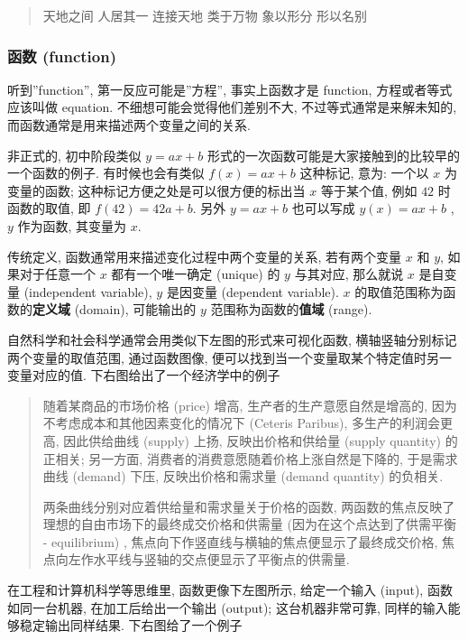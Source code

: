 \begin{quote}
天地之间 人居其一 连接天地 类于万物 象以形分 形以名别
\end{quote}

\hypertarget{ux51fdux6570-function}{%
\subsubsection{函数 (function)}\label{ux51fdux6570-function}}

听到''function'', 第一反应可能是''方程'', 事实上函数才是 function,
方程或者等式应该叫做 equation. 不细想可能会觉得他们差别不大,
不过等式通常是来解未知的, 而函数通常是用来描述两个变量之间的关系.

非正式的, 初中阶段类似 \(y=ax+b\)
形式的一次函数可能是大家接触到的比较早的一个函数的例子. 有时候也会有类似
\(f(x)=ax+b\) 这种标记, 意为: 一个以 \(x\) 为变量的函数;
这种标记方便之处是可以很方便的标出当 \(x\) 等于某个值, 例如 \(42\)
时函数的取值, 即 \(f(42)=42a+b\). 另外 \(y=ax+b\) 也可以写成
\(y(x)=ax+b\) , \(y\) 作为函数, 其变量为 \(x\).

传统定义, 函数通常用来描述变化过程中两个变量的关系, 若有两个变量 \(x\)
和 \(y\), 如果对于任意一个 \(x\) 都有一个唯一确定 (unique) 的 \(y\)
与其对应, 那么就说 \(x\) 是自变量 (independent variable), \(y\) 是因变量
(dependent variable). \(x\) 的取值范围称为函数的\textbf{定义域}
(domain), 可能输出的 \(y\) 范围称为函数的\textbf{值域} (range).

自然科学和社会科学通常会用类似下左图的形式来可视化函数,
横轴竖轴分别标记两个变量的取值范围, 通过函数图像,
便可以找到当一个变量取某个特定值时另一变量对应的值.
下右图给出了一个经济学中的例子

\begin{quote}
随着某商品的市场价格 (price) 增高, 生产者的生产意愿自然是增高的,
因为不考虑成本和其他因素变化的情况下 (Ceteris Paribus),
多生产的利润会更高, 因此供给曲线 (supply) 上扬, 反映出价格和供给量
(supply quantity) 的正相关; 另一方面,
消费者的消费意愿随着价格上涨自然是下降的, 于是需求曲线 (demand) 下压,
反映出价格和需求量 (demand quantity) 的负相关.

两条曲线分别对应着供给量和需求量关于价格的函数,
两函数的焦点反映了理想的自由市场下的最终成交价格和供需量
(因为在这个点达到了供需平衡 - equilibrium) ,
焦点向下作竖直线与横轴的焦点便显示了最终成交价格,
焦点向左作水平线与竖轴的交点便显示了平衡点的供需量.
\end{quote}

在工程和计算机科学等思维里, 函数更像下左图所示, 给定一个输入 (input),
函数如同一台机器, 在加工后给出一个输出 (output); 这台机器非常可靠,
同样的输入能够稳定输出同样结果. 下右图给了一个例子

